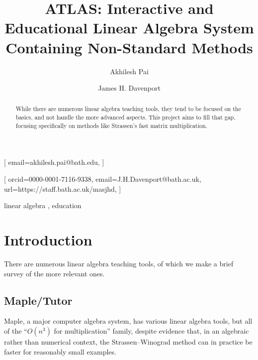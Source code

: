 \documentclass[
]{ceurart}
\begin{document}


\title{ATLAS: Interactive and Educational Linear Algebra System Containing Non-Standard Methods}

\author[1]{Akhilesh Pai}[%
email=akhilesh.pai@bath.edu,
]
\address[1]{University of Bath, Bath BA2 7AY, UK}
\author[1]{James H. Davenport}[%
orcid=0000-0001-7116-9338,
email=J.H.Davenport@bath.ac.uk,
url=https://staff.bath.ac.uk/masjhd,
]

\begin{abstract}
While there are numerous linear algebra teaching tools, they tend to be focused on the basics, and not handle the more advanced aspects. This project aims to fill that gap, focusing specifically on methods like Strassen's fast matrix multiplication.
\end{abstract}

\begin{keywords}
  linear algebra \sep
  education
\end{keywords}

\maketitle
\section{Introduction}
There are numerous linear algebra teaching tools, of which we make a brief survey of the more relevant ones.
\subsection{Maple/Tutor}
Maple, a major computer algebra system, has various linear algebra tools, but all of the ``$O(n^3)$ for multiplication'' family, despite evidence \cite{Tonksetal2017a} that, in an algebraic rather than numerical context, the Strassen--Winograd \cite{Strassen1969,Winograd1971} method can in practice be faster for reasonably small examples.
\end{document}

